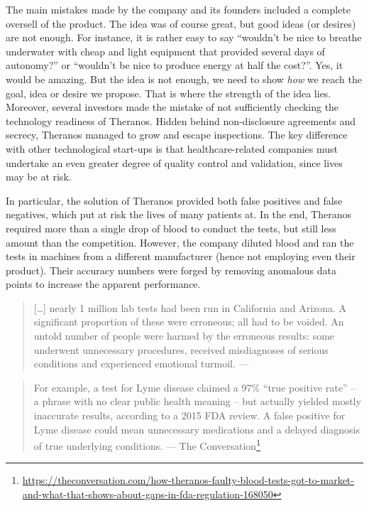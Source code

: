 \documentclass[
  12pt,
]{book}
\DeclareRobustCommand{\href}[2]{#2\footnote{\url{#1}}}
\begin{document}
The main mistakes made by the company and its founders included a complete oversell of the product. The idea was of course great, but good ideas (or desires) are not enough. For instance, it is rather easy to say ``wouldn't be nice to breathe underwater with cheap and light equipment that provided several days of autonomy?'' or ``wouldn't be nice to produce energy at half the cost?''. Yes, it would be amazing. But the idea is not enough, we need to show \emph{how} we reach the goal, idea or desire we propose. That is where the strength of the idea lies. Moreover, several investors made the mistake of not sufficiently checking the technology readiness of Theranos. Hidden behind non-disclosure agreements and secrecy, Theranos managed to grow and escape inspections. The key difference with other technological start-ups is that healthcare-related companies must undertake an even greater degree of quality control and validation, since lives may be at risk.

In particular, the solution of Theranos provided both false positives and false negatives, which put at risk the lives of many patients at. In the end, Theranos required more than a single drop of blood to conduct the tests, but still less amount than the competition. However, the company diluted blood and ran the tests in machines from a different manufacturer (hence not employing even their product). Their accuracy numbers were forged by removing anomalous data points to increase the apparent performance.

\begin{quote}
{[}\ldots{]} nearly 1 million lab tests had been run in California and Arizona. A significant proportion of these were erroneous; all had to be voided. An untold number of people were harmed by the erroneous results: some underwent unnecessary procedures, received misdiagnoses of serious conditions and experienced emotional turmoil. --- \citep{topol2018blood}
\end{quote}

\begin{quote}
For example, a test for Lyme disease claimed a 97\% ``true positive rate'' -- a phrase with no clear public health meaning -- but actually yielded mostly inaccurate results, according to a 2015 FDA review. A false positive for Lyme disease could mean unnecessary medications and a delayed diagnosis of true underlying conditions. --- \href{https://theconversation.com/how-theranos-faulty-blood-tests-got-to-market-and-what-that-shows-about-gaps-in-fda-regulation-168050}{The Conversation}
\end{quote}
\end{document}
